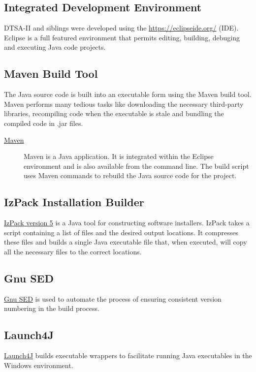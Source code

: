 \documentclass{article}
\begin{document}
\subsection{Integrated Development Environment}
DTSA-II and siblings were developed using the \href{Eclipse Integrated Development Environment}{https://eclipseide.org/} (IDE).  Eclipse is a full featured environment that permits editing, building, debuging and executing Java code projects.
\subsection{Maven Build Tool}
The Java source code is built into an executable form using the Maven build tool.  Maven performs many tedious tasks like downloading the necessary third-party libraries, recompiling code when the executable is stale and bundling the compiled code in .jar files.
\begin{description}
    \item[\href{https://maven.apache.org/}{Maven}]  Maven is a Java application. It is integrated within the Eclipse environment and is also available from the command line.  The build script uses Maven commands to rebuild the Java source code for the project.
\end{description}
\subsection{IzPack Installation Builder}
\href{https://izpack.org/}{IzPack version 5} is a Java tool for constructing software installers.  IzPack takes a script containing a list of files and the desired output locations.  It compresses these files and builds a single Java executable file that, when executed, will copy all the necessary files to the correct locations.
\subsection{Gnu SED}
\href{https://www.gnu.org/software/sed/}{Gnu SED} is used to automate the process of ensuring consistent version numbering in the build process.
\subsection{Launch4J}
\href{https://launch4j.sourceforge.net/}{Launch4J} builds executable wrappers to facilitate running Java executables in the Windows environment.
\end{document}

